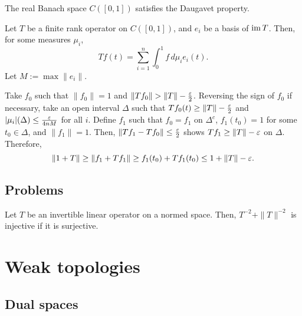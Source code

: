 \documentclass{../../large}
\begin{document}
\begin{prb}
\begin{parts}
\item The real Banach space $C([0,1])$ satisfies the Daugavet property.
\end{parts}
\end{prb}
\begin{pf}
Let $T$ be a finite rank operator on $C([0,1])$, and $e_i$ be a basis of $\operatorname{im} T$.
Then, for some measures $\mu_i$,
\[Tf(t)=\sum_{i=1}^n\int_0^1f\,d\mu_ie_i(t).\]
Let $M:=\max\|e_i\|$.

Take $f_0$ such that $\|f_0\|=1$ and $\|Tf_0\|>\|T\|-\frac\e2$.
Reversing the sign of $f_0$ if necessary, take an open interval $\Delta$ such that $Tf_0(t)\ge\|T\|-\frac{\varepsilon}2$ and $|\mu_i|(\Delta)\le\frac{\varepsilon}{4nM}$ for all $i$.
Define $f_1$ such that $f_0=f_1$ on $\Delta^c$, $f_1(t_0)=1$ for some $t_0\in\Delta$, and $\|f_1\|=1$.
Then, $\|Tf_1-Tf_0\|\le\frac{\varepsilon}2$ shows $Tf_1\ge\|T\|-\varepsilon$ on $\Delta$.
Therefore,
\[\|1+T\|\ge\|f_1+Tf_1\|\ge f_1(t_0)+Tf_1(t_0)\le1+\|T\|-\varepsilon.\]
\end{pf}


\section*{Problems}
\begin{prb}
Let $T$ be an invertible linear operator on a normed space.
Then, $T^{-2}+\|T\|^{-2}$ is injective if it is surjective.
\end{prb}
















\chapter{Weak topologies}
\section{Dual spaces}

\begin{prb}[Bidual]
\end{prb}
\end{document}
